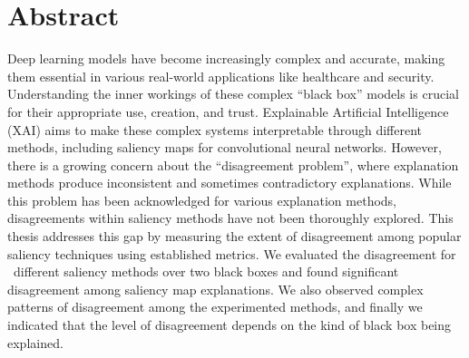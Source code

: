 \chapter*{Abstract}
\label{abstract}
Deep learning models have become increasingly complex and accurate, making them essential in various real-world applications like healthcare and security. Understanding the inner workings of these complex ``black box'' models is crucial for their appropriate use, creation, and trust. Explainable Artificial Intelligence (XAI) aims to make these complex systems interpretable through different methods, including saliency maps for convolutional neural networks. However, there is a growing concern about the ``disagreement problem'', where explanation methods produce inconsistent and sometimes contradictory explanations. While this problem has been acknowledged for various explanation methods, disagreements within saliency methods have not been thoroughly explored. This thesis addresses this gap by measuring the extent of disagreement among popular saliency techniques using established metrics. We evaluated the disagreement for \numExperimentedMethods\ different saliency methods over two black boxes and found significant disagreement among saliency map explanations. We also observed complex patterns of disagreement among the experimented methods, and finally we indicated that the level of disagreement depends on the kind of black box being explained.